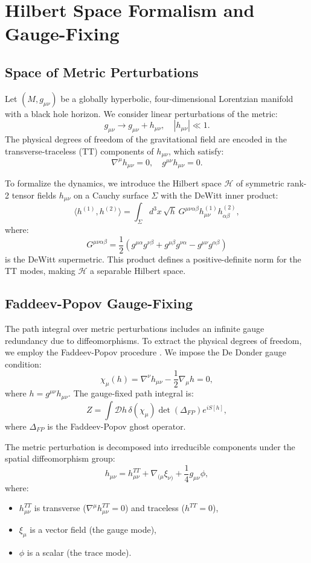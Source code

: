 \documentclass[%
 preprint,
 aps,
 prd,
 amsmath,amssymb,
 floatfix,
 longbibliography,
]{revtex4-2}
\begin{document}
\section{Hilbert Space Formalism and Gauge-Fixing}
\label{sec:hilbert}

\subsection{Space of Metric Perturbations}

Let \((M,g_{\mu\nu})\) be a globally hyperbolic, four-dimensional Lorentzian manifold with a black hole horizon. We consider linear perturbations of the metric:
\[
g_{\mu\nu} \to g_{\mu\nu} + h_{\mu\nu}, \quad |h_{\mu\nu}| \ll 1.
\]
The physical degrees of freedom of the gravitational field are encoded in the transverse-traceless (TT) components of \(h_{\mu\nu}\), which satisfy:
\[
\nabla^\mu h_{\mu\nu} = 0, \quad g^{\mu\nu} h_{\mu\nu} = 0.
\]

To formalize the dynamics, we introduce the Hilbert space \(\mathcal{H}\) of symmetric rank-2 tensor fields \(h_{\mu\nu}\) on a Cauchy surface \(\Sigma\) with the DeWitt inner product:
\[
\boxed{\langle h^{(1)}, h^{(2)} \rangle = \int_\Sigma d^3x \, \sqrt{h} \, G^{\mu\nu\alpha\beta} h^{(1)}_{\mu\nu} h^{(2)}_{\alpha\beta},}
\]
where:
\[
G^{\mu\nu\alpha\beta} = \frac{1}{2}(g^{\mu\alpha}g^{\nu\beta} + g^{\mu\beta}g^{\nu\alpha} - g^{\mu\nu}g^{\alpha\beta})
\]
is the DeWitt supermetric. This product defines a positive-definite norm for the TT modes, making \(\mathcal{H}\) a separable Hilbert space.

\subsection{Faddeev-Popov Gauge-Fixing}
\label{subsec:faddeev}

The path integral over metric perturbations includes an infinite gauge redundancy due to diffeomorphisms. To extract the physical degrees of freedom, we employ the Faddeev-Popov procedure \cite{DeWitt1967, FaddeevPopov1967}. We impose the De Donder gauge condition:
\[
\chi_\mu(h) = \nabla^\nu h_{\mu\nu} - \frac{1}{2}\nabla_\mu h = 0,
\]
where \(h = g^{\mu\nu} h_{\mu\nu}\). The gauge-fixed path integral is:
\[
Z = \int \mathcal{D}h \, \delta(\chi_\mu) \det(\Delta_{FP}) e^{i S[h]},
\]
where \(\Delta_{FP}\) is the Faddeev-Popov ghost operator.

The metric perturbation is decomposed into irreducible components under the spatial diffeomorphism group:
\[
\boxed{h_{\mu\nu} = h_{\mu\nu}^{TT} + \nabla_{(\mu}\xi_{\nu)} + \frac{1}{4}g_{\mu\nu}\phi,}
\]
where:
\begin{itemize}
\item \(h_{\mu\nu}^{TT}\) is transverse (\(\nabla^\mu h_{\mu\nu}^{TT}=0\)) and traceless (\(h^{TT}=0\)),
\item \(\xi_\mu\) is a vector field (the gauge mode),
\item \(\phi\) is a scalar (the trace mode).
\end{itemize}
\end{document}
